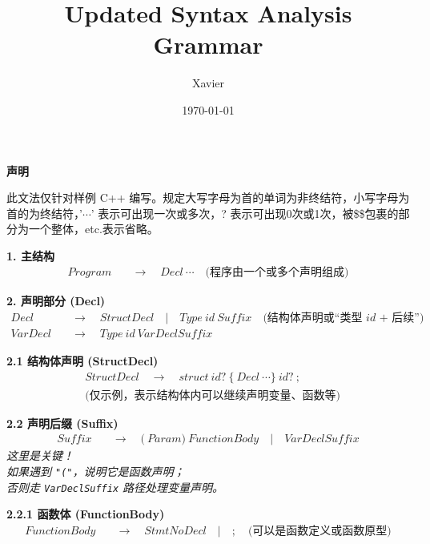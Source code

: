 \documentclass[11pt]{article}
\author{Xavier}
\date{\today}
\title{Updated Syntax Analysis Grammar}
\begin{document}
    \begin{titlepage}
        \maketitle
        \centering
        \vspace*{\fill}
        {\Large \textbf{\LARGE 声明} \\[1.5cm]
        \parbox{1\textwidth}{此文法仅针对样例 C++ 编写。规定大写字母为首的单词为非终结符，小写字母为首的为终结符，'$\cdots$' 表示可出现一次或多次，? 表示可出现0次或1次，被\$\$包裹的部分为一个整体，etc.表示省略。}
        }
        \vspace{3cm}
    \end{titlepage}

    \centering
    \textbf{1. 主结构}
    \begin{align*}
        Program &\quad \to\quad Decl\ \cdots
        \quad\textit{(程序由一个或多个声明组成)}
    \end{align*}

    \textbf{2. 声明部分 (Decl)}
    \begin{align*}
        Decl &\quad \to\quad StructDecl \quad |\quad Type\ id\ Suffix
        \quad\textit{(结构体声明或“类型 id + 后续”)} \\
        VarDecl &\quad \to\quad Type\ id\ VarDeclSuffix
    \end{align*}

    \textbf{2.1 结构体声明 (StructDecl)}
    \begin{align*}
        &StructDecl \quad \to\quad struct\ id?\ \{\ Decl\ \cdots \}\ id?\ ;\\
        &\textit{(仅示例，表示结构体内可以继续声明变量、函数等)}
    \end{align*}

    \textbf{2.2 声明后缀 (Suffix)}
    \begin{align*}
        Suffix &\quad \to\quad \bigl(\ Param \bigr)\ FunctionBody 
        \quad |\quad VarDeclSuffix
    \end{align*}
    \textit{%
        这里是关键！\\
        如果遇到 \texttt{"("}，说明它是函数声明；\\
        否则走 \texttt{VarDeclSuffix} 路径处理变量声明。%
    }
    \par 
    \vspace{3em}
    \textbf{2.2.1 函数体 (FunctionBody)}
    \begin{align*}
        FunctionBody &\quad \to\quad StmtNoDecl
        \quad|\quad ;
        \quad\textit{(可以是函数定义或函数原型)}
    \end{align*}
\end{document}
